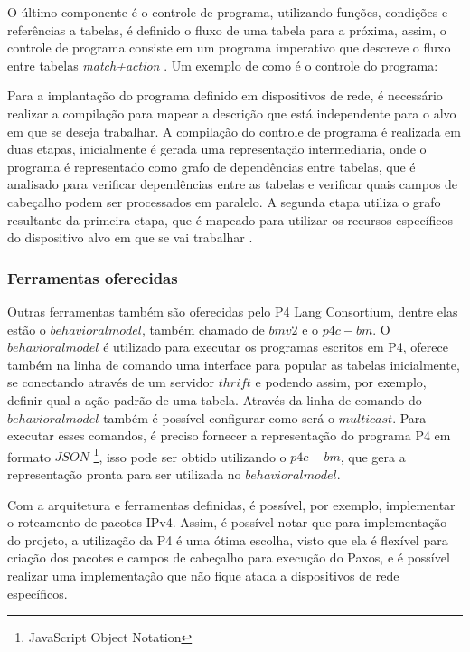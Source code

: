 \documentclass[12pt,
openright, 
oneside,
a4paper,
brazil]{facom-ufu-abntex2}
\theoremstyle{definition}
\begin{document}
O último componente é o controle de programa, utilizando funções, condições e referências
a tabelas, é definido o fluxo de uma tabela para a próxima, assim, o controle de programa
consiste em um programa imperativo que descreve o fluxo entre tabelas \textit{match+action} 
\citep{bosshart2014p4}. Um exemplo de como é o controle do programa: 



Para a implantação do programa definido em dispositivos de rede, é necessário realizar
a compilação para mapear a descrição que está independente para o alvo em que se deseja
trabalhar. A compilação do controle de programa é realizada em duas etapas, inicialmente
é gerada uma representação intermediaria, onde o programa é representado como grafo de
dependências entre tabelas, que é analisado para verificar dependências entre as tabelas
e verificar quais campos de cabeçalho podem ser processados em paralelo. A segunda etapa
utiliza o grafo resultante da primeira etapa, que é mapeado para utilizar os recursos
específicos do dispositivo alvo em que se vai trabalhar \citep{bosshart2014p4}.

\subsubsection{Ferramentas oferecidas}
Outras ferramentas também são oferecidas pelo P4 Lang Consortium, dentre elas estão o 
$behavioral model$, também chamado de $bmv2$ e o $p4c-bm$. O $behavioral model$ é utilizado 
para executar os programas escritos em P4, oferece também na linha de comando uma interface 
para popular as tabelas inicialmente, se conectando através de um servidor $thrift$ e podendo 
assim, por exemplo, definir qual a ação padrão de uma tabela. Através da linha de comando do 
$behavioral model$ também é possível configurar como será o $multicast$. Para executar esses 
comandos, é preciso fornecer a representação do programa P4 em formato $JSON$
\footnote{JavaScript Object Notation}, isso pode ser obtido utilizando o $p4c-bm$, que gera a 
representação pronta para ser utilizada no $behavioral model$.

Com a arquitetura e ferramentas definidas, é possível, por exemplo, implementar o roteamento 
de pacotes IPv4. Assim, é possível notar que para implementação do projeto, a utilização da P4
é uma ótima escolha, visto que ela é flexível para criação dos pacotes e campos de cabeçalho
para execução do Paxos, e é possível realizar uma implementação que não fique atada a 
dispositivos de rede específicos.
\end{document}
